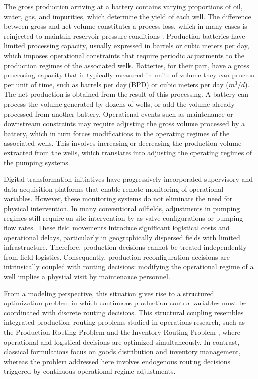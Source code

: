 The gross production arriving at a battery contains varying proportions of oil, water, gas, and impurities, which determine the yield of each well. The difference between gross and net volume constitutes a process loss, which in many cases is reinjected to maintain reservoir pressure conditions\cite{HASSAN2023181} . Production batteries have limited processing capacity, usually expressed in barrels or cubic meters per day, which imposes operational constraints that require periodic adjustments to the production regimes of the associated wells.
Batteries, for their part, have a gross processing capacity that is typically measured in units of volume they can process per unit of time, such as barrels per day (BPD) or cubic meters per day ($m^3/d$). The net production is obtained from the result of this processing. A battery can process the volume generated by dozens of wells, or add the volume already processed from another battery. Operational events such as maintenance or downstream constraints may require adjusting the gross volume processed by a battery, which in turn forces modifications in the operating regimes of the associated wells. This involves increasing or decreasing the production volume extracted from the wells, which translates into adjusting the operating regimes of the pumping systems.

Digital transformation initiatives have progressively incorporated supervisory and data acquisition platforms that enable remote monitoring of operational variables\cite{BIST2024100256}. However, these monitoring systems do not eliminate the need for physical intervention. In many conventional oilfields, adjustments in pumping regimes still require on-site intervention by as valve configurations or pumping flow rates. These field movements introduce significant logistical costs and operational delays, particularly in geographically dispersed fields with limited infrastructure. Therefore, production decisions cannot be treated independently from field logistics. Consequently, production reconfiguration decisions are intrinsically coupled with routing decisions: modifying the operational regime of a well implies a physical visit by maintenance personnel.

From a modeling perspective, this situation gives rise to a structured optimization problem in which continuous production control variables must be coordinated with discrete routing decisions. This structural coupling resembles integrated production–routing problems studied in operations research, such as the Production Routing Problem \cite{doi:10.1287/ijoc.1100.0439} and the Inventory Routing Problem \cite{Bertazzi2008} , where operational and logistical decisions are optimized simultaneously. In contrast, classical formulations focus on goods distribution and inventory management, whereas the problem addressed here involves endogenous routing decisions triggered by continuous operational regime adjustments.

